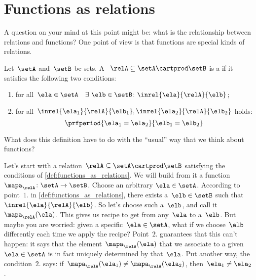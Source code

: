 \section{Functions as relations}
A question on your mind at this point might be: what is the relationship between relations and functions?
One point of view is that functions are special kinds of relations.

\begin{definition}
    \label{def:functions_as_relations}
    Let~$\setA$ and~$\setB$ be sets.
    A ~$\relA \subseteq \setA \cartprod \setB$ is a \emph{} if it satisfies the following two conditions:
    \begin{enumerate}
        \item for all~$\ela \in \setA \quad \exists \ \elb \in \setB\colon  \inrel{\ela}{\relA}{\elb}$;
        \item for all~$\inrel{\ela_1}{\relA}{\elb_1}, \inrel{\ela_2}{\relA}{\elb_2}$ holds:
              \begin{equation*}
                  \prfperiod{\ela_1 = \ela_2}{\elb_1 = \elb_2}
              \end{equation*}
    \end{enumerate}
\end{definition}

What does this definition have to do with the ``usual'' way that we think about functions?

Let's start with a relation~$\relA \subseteq \setA \cartprod \setB$ satisfying the conditions of \cref{def:functions_as_relations}.
We will build from it a function~$\mapa_\relA \colon \setA \to \setB$.
Choose an arbitrary $\ela \in \setA$.
According to point~$1.
$ in \cref{def:functions_as_relations}, there exists a~$\elb \in \setB$ such that~$\inrel{\ela}{\relA}{\elb}$.
So let's choose such a~$\elb$, and call it~$\mapa_\relA(\ela)$.
This gives us recipe to get from any~$\ela$ to a~$\elb$.
But maybe you are worried: given a specific~$\ela \in \setA$, what if we choose~$\elb$ differently each time we apply the recipe?
Point~$2.
$ guarantees that this can't happen: it says that the element~$\mapa_\relA(\ela)$ that we associate to a given~$\ela \in \setA$ is in fact uniquely determined by that~$\ela$.
Put another way, the condition~$2.
$ says: if~$\mapa_\relA(\ela_1) \neq \mapa_\relA(\ela_2)$, then~$\ela_1 \neq\ela_2$.

